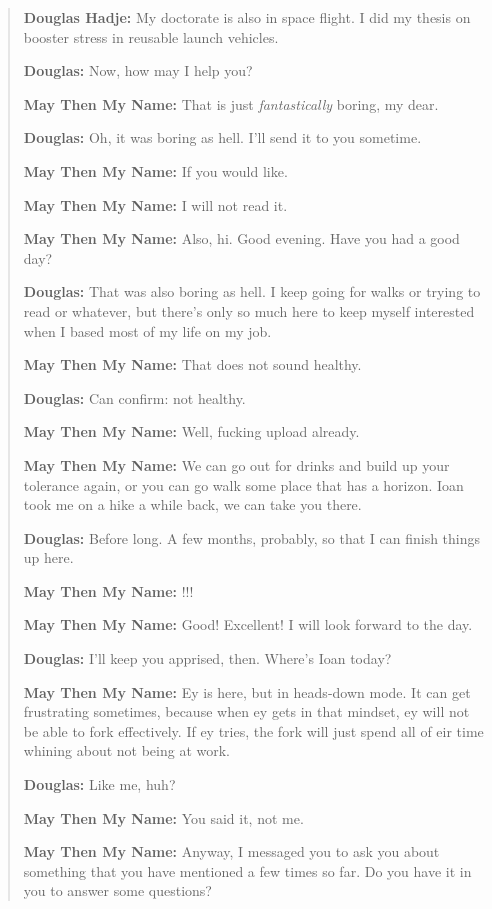 \begin{quote}
\textbf{Douglas Hadje:} My doctorate is also in space flight. I did my thesis on booster stress in reusable launch vehicles.

\textbf{Douglas:} Now, how may I help you?

\textbf{May Then My Name:} That is just \emph{fantastically} boring, my dear.

\textbf{Douglas:} Oh, it was boring as hell. I'll send it to you sometime.

\textbf{May Then My Name:} If you would like.

\textbf{May Then My Name:} I will not read it.

\textbf{May Then My Name:} Also, hi. Good evening. Have you had a good day?

\textbf{Douglas:} That was also boring as hell. I keep going for walks or trying to read or whatever, but there's only so much here to keep myself interested when I based most of my life on my job.

\textbf{May Then My Name:} That does not sound healthy.

\textbf{Douglas:} Can confirm: not healthy.

\textbf{May Then My Name:} Well, fucking upload already.

\textbf{May Then My Name:} We can go out for drinks and build up your tolerance again, or you can go walk some place that has a horizon. Ioan took me on a hike a while back, we can take you there.

\textbf{Douglas:} Before long. A few months, probably, so that I can finish things up here.

\textbf{May Then My Name:} !!!

\textbf{May Then My Name:} Good! Excellent! I will look forward to the day.

\textbf{Douglas:} I'll keep you apprised, then. Where's Ioan today?

\textbf{May Then My Name:} Ey is here, but in heads-down mode. It can get frustrating sometimes, because when ey gets in that mindset, ey will not be able to fork effectively. If ey tries, the fork will just spend all of eir time whining about not being at work.

\textbf{Douglas:} Like me, huh?

\textbf{May Then My Name:} You said it, not me.

\textbf{May Then My Name:} Anyway, I messaged you to ask you about something that you have mentioned a few times so far. Do you have it in you to answer some questions?


\end{quote}
